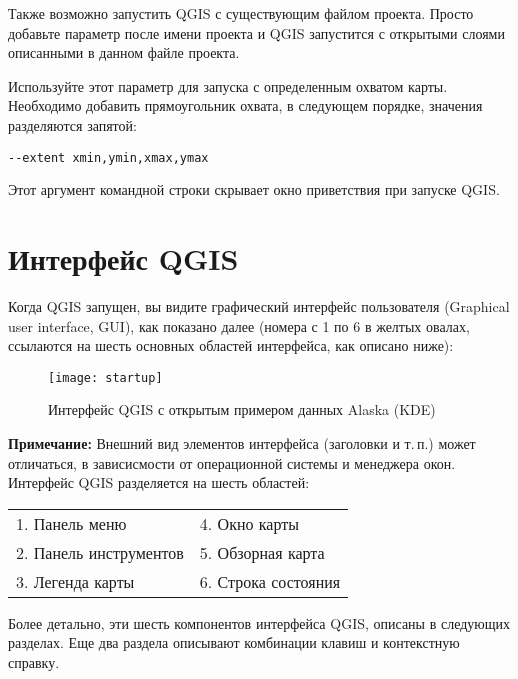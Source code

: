 Также возможно запустить QGIS с существующим файлом проекта. Просто
добавьте параметр  после имени проекта и QGIS
запустится с открытыми слоями описанными в данном файле проекта.

Используйте этот параметр для запуска с определенным охватом карты.
Необходимо добавить прямоугольник охвата, в следующем порядке, значения
разделяются запятой:
\begin{verbatim}
--extent xmin,ymin,xmax,ymax
\end{verbatim}

Этот аргумент командной строки скрывает окно приветствия при запуске QGIS.

\section{Интерфейс QGIS}
\label{label_qgismainwindow}

Когда QGIS запущен, вы видите графический интерфейс пользователя
(Graphical user interface, GUI), как показано далее (номера с 1 по 6 в
желтых овалах, ссылаются на шесть основных областей интерфейса, как
описано ниже):

\begin{figure}[ht]
   \centering
    \texttt{[image: startup]}
    \caption{Интерфейс QGIS с открытым примером данных Alaska \nixcaption (KDE)} \label{fig:startup}
\end{figure}

\textbf{Примечание:} Внешний вид элементов интерфейса (заголовки
и т.\,п.) может отличаться, в зависисмости от операционной системы и
менеджера окон.\\

Интерфейс QGIS разделяется на шесть областей:

\begin{tabular}{p{5cm} p{5cm}}
1. Панель меню & 4. Окно карты \\
2. Панель инструментов & 5. Обзорная карта \\
3. Легенда карты & 6. Строка состояния \\
\end{tabular}

Более детально, эти шесть компонентов интерфейса QGIS, описаны в следующих
разделах. Еще два раздела описывают комбинации клавиш и контекстную справку.

